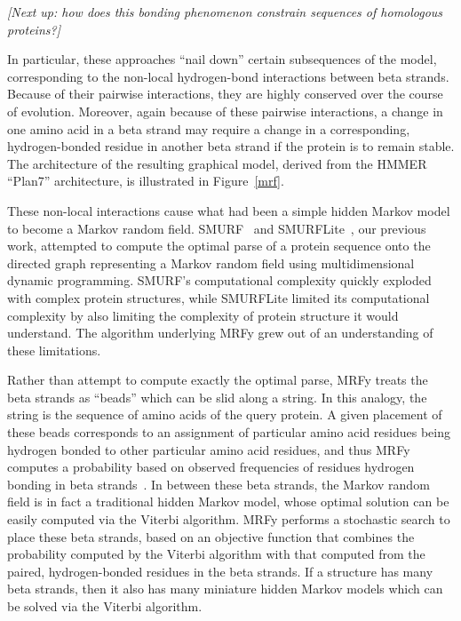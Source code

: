 \documentclass[preprint,nonatbib,blockstyle,nocopyrightspace,times]{sigplanconf}
\let\cite\citep
\begin{document}
\emph{[Next up: how does this bonding phenomenon constrain sequences
of homologous proteins?]}



In particular, these approaches ``nail down'' 
certain subsequences of the model, corresponding to the non-local hydrogen-bond 
interactions between beta strands.
Because of their pairwise 
interactions, they are highly conserved over the course of evolution.
Moreover, 
again because of these pairwise interactions, a change in one amino acid in a 
beta strand may require a change in a corresponding, hydrogen-bonded residue in 
another beta strand if the protein is to remain stable.
The architecture of the 
resulting graphical model, derived from the HMMER ``Plan7'' architecture, is 
illustrated in Figure~\ref{mrf}.

These non-local interactions cause what had been a simple hidden Markov model 
to become a Markov random field.
SMURF~\cite{Menke:2010ti} and SMURFLite~\cite{Daniels:2012}, our previous work,
attempted to compute the 
optimal parse of a protein sequence onto the directed graph representing a 
Markov random field using multidimensional dynamic programming.
SMURF's 
computational complexity quickly exploded with complex protein structures, 
while SMURFLite limited its computational complexity by also limiting the 
complexity of protein structure it would understand.
The algorithm underlying 
MRFy grew out of an understanding of these limitations.


Rather than attempt to compute exactly the optimal parse, MRFy treats the beta 
strands as ``beads'' which can be slid along a string.
In this analogy, the 
string is the sequence of amino acids of the query protein.
A given placement 
of these beads corresponds to an assignment of particular amino acid residues 
being hydrogen bonded to other particular amino acid residues, and thus MRFy 
computes a probability based on observed frequencies of residues hydrogen 
bonding in beta strands~\cite{Cowen:2002p588}.
In between these beta strands, the 
Markov random field is in fact a traditional hidden Markov model, whose optimal 
solution can be easily computed via the Viterbi algorithm.
MRFy performs a 
stochastic search to place these beta strands, based on an objective function 
that combines the probability computed by the Viterbi algorithm with that 
computed from the paired, hydrogen-bonded residues in the beta strands.
If a 
structure has many beta strands, then it also has many miniature hidden Markov 
models which can be solved via the Viterbi algorithm.
\end{document}
